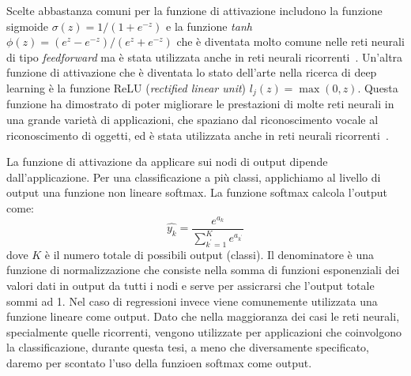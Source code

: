 Scelte abbastanza comuni per la funzione di attivazione includono la funzione sigmoide $\sigma(z) = 1/(1+e^{-z})$ e la funzione \emph{tanh} $\phi(z)=(e^z-e^{-z})/(e^z+e^{-z})$ che \`e diventata molto comune nelle reti neurali di tipo \emph{feedforward} ma \`e stata utilizzata anche in reti neurali ricorrenti~\cite{Sutskever:2011}.
Un'altra funzione di attivazione che \`e diventata lo stato dell'arte nella ricerca di deep learning \`e la funzione ReLU (\emph{rectified linear unit}) $l_j(z)=\operatorname{max}(0, z)$.
Questa funzione ha dimostrato di poter migliorare le prestazioni di molte reti neurali in una grande variet\`a di applicazioni, che spaziano dal riconoscimento vocale al riconoscimento di oggetti, ed \`e stata utilizzata anche in reti neurali ricorrenti~\cite{Bengio:2013}.

La funzione di attivazione da applicare sui nodi di output dipende dall'applicazione.
Per una classificazione a pi\`u classi, applichiamo al livello di output una funzione non lineare softmax.
La funzione softmax calcola l'output come:
\begin{equation}
  \hat{y_k} = \frac{e^{a_k}}{\sum_{k^{'}=1}^{K} e^{a_{k^{'}}}}
\end{equation}
dove $K$ \`e il numero totale di possibili output (classi). Il denominatore \`e una funzione di normalizzazione che consiste nella somma di funzioni esponenziali dei valori dati in output da tutti i nodi e serve per assicrarsi che l'output totale sommi ad 1.
Nel caso di regressioni invece viene comunemente utilizzata una funzione lineare come output.
Dato che nella maggioranza dei casi le reti neurali, specialmente quelle ricorrenti, vengono utilizzate per applicazioni che coinvolgono la classificazione, durante questa tesi, a meno che diversamente specificato, daremo per scontato l'uso della funzioen softmax come output.

